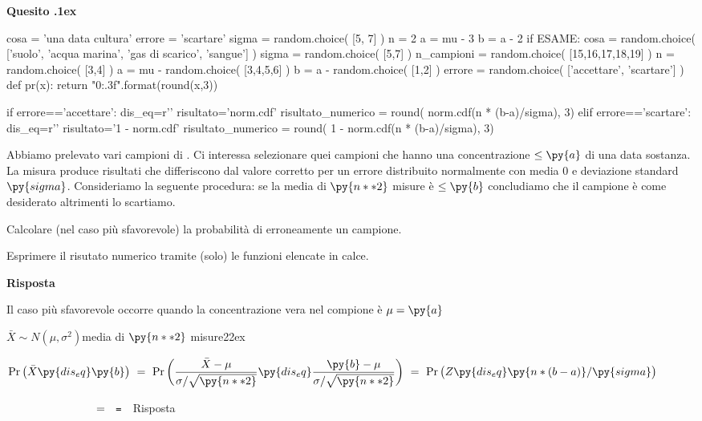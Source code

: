 \documentclass[11pt,twoside,a4paper]{article}
\def\Pr{{\rm Pr\,}}
\newcounter{quesito}
\newenvironment{question}{\addtocounter{quesito}{1}\bigskip\bigskip\par\textbf{Quesito \thequesito.\kern1ex}}{\vspace{\parskip}}
\newenvironment{answer}{\par\textbf{Risposta\quad}}{\vspace{\parskip}}
\begin{document}
\clearpage
\begin{question} %
\begin{pycode}
cosa = 'una data cultura'
errore = 'scartare'
sigma = random.choice( [5, 7] )
n = 2
a = mu - 3 
b = a - 2
if ESAME:
    cosa = random.choice( ['suolo', 'acqua marina', 'gas di scarico', 'sangue'] )
    sigma = random.choice( [5,7] )
    n_campioni = random.choice( [15,16,17,18,19] )
    n = random.choice( [3,4] )
    a = mu - random.choice( [3,4,5,6] )
    b = a - random.choice( [1,2] )
    errore =  random.choice( ['accettare', 'scartare'] )
def pr(x):
    return "{0:.3f}".format(round(x,3))

if errore=='accettare':
    dis_eq=r'\le'
    risultato='norm.cdf'
    risultato_numerico = round( norm.cdf(n * (b-a)/sigma), 3)
elif errore=='scartare':
    dis_eq=r'\ge'
    risultato='1 - norm.cdf'
    risultato_numerico = round( 1 -  norm.cdf(n * (b-a)/sigma), 3)
    
\end{pycode}
Abbiamo prelevato vari campioni di . Ci interessa selezionare quei campioni che hanno una concentrazione $\le\py{a}$ di una data sostanza. La misura produce risultati che differiscono dal valore corretto per un errore distribuito normalmente con media $0$ e deviazione standard $\py{sigma}$. Consideriamo la seguente procedura: se la media di $\py{n**2}$ misure è $\le\py{b}$ concludiamo che il campione è come desiderato altrimenti lo scartiamo.

Calcolare (nel caso più sfavorevole) la probabilità di  erroneamente un campione.

Esprimere il risutato numerico tramite (solo) le funzioni elencate in calce.
\begin{answer}

Il caso più sfavorevole occorre quando la concentrazione vera nel compione è $\mu=\py{a}$ 


$\bar X\sim N(\mu,\sigma^2)$\hfill media di $\py{n**2}$ misure\kern22ex

$\displaystyle\Pr\big(\bar X\py{dis_eq}\py{b}\big)\ =\ \Pr\bigg(\frac{\bar X-\mu}{\sigma/\sqrt{\py{n**2}}}\py{dis_eq}\frac{\py{b}-\mu}{\sigma/\sqrt{\py{n**2}}}\bigg)\ =\  \Pr\big(Z\py{dis_eq}\py{n * (b-a) } /\py{sigma} \big)$

$\phantom{\Pr\big(\bar X\le\py{b}\big)}\ =\ ${}{\tt\ =\  }\hfill {\color{blue}\hfill Risposta}

\end{answer}
\end{question}
\end{document}
